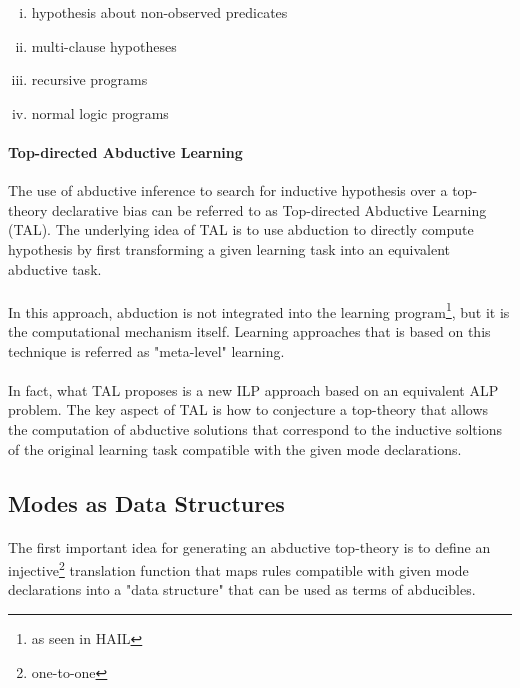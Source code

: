 \documentclass{article}
\theoremstyle{plain}
\theoremstyle{definition}
\begin{document}
\begin{multicols}{2}
\begin{enumerate}[i)]
\item hypothesis about non-observed predicates
\item multi-clause hypotheses
\item recursive programs
\item normal logic programs
\end{enumerate}

\paragraph{Top-directed Abductive Learning} The use of abductive inference to search for inductive hypothesis over a top-theory declarative bias can be referred to as Top-directed Abductive Learning (TAL). The underlying idea of TAL is to use abduction to directly compute hypothesis by first transforming a given learning task into an equivalent abductive task. 

\paragraph{} In this approach, abduction is not integrated into the learning program\footnote{as seen in HAIL}, but it is the computational mechanism itself. Learning approaches that is based on this technique is referred as "meta-level" learning.

\paragraph{} In fact, what TAL proposes is a new ILP approach based on an equivalent ALP problem. The key aspect of TAL is how to conjecture a top-theory that allows the computation of abductive solutions that correspond to the inductive soltions of the original learning task compatible with the given mode declarations.

\subsection{Modes as Data Structures}

\paragraph{} The first important idea for generating an abductive top-theory is to define an injective\footnote{one-to-one} translation function that maps rules compatible with given mode declarations into a "data structure" that can be used as terms of abducibles.


\end{multicols}
\end{document}

